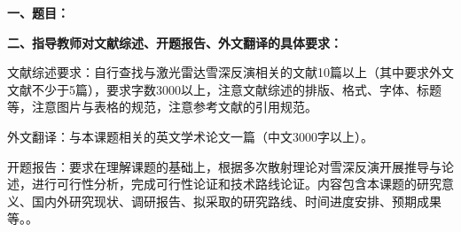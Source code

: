 \thispagestyle{tocprevious}
\pagestyle{tocprevious}

{
    \setlength{\parindent}{0em}
    \par {\bfseries 一、题目：\Title}
    \\
    \par {\bfseries 二、指导教师对文献综述、开题报告、外文翻译的具体要求：}
}
\vspace{0.5em}
\par 文献综述要求：自行查找与激光雷达雪深反演相关的文献10篇以上（其中要求外文文献不少于5篇），要求字数3000以上，注意文献综述的排版、格式、字体、标题等，注意图片与表格的规范，注意参考文献的引用规范。

\noindent 外文翻译：与本课题相关的英文学术论文一篇（中文3000字以上）。

\noindent 开题报告：要求在理解课题的基础上，根据多次散射理论对雪深反演开展推导与论述，进行可行性分析，完成可行性论证和技术路线论证。内容包含本课题的研究意义、国内外研究现状、调研报告、拟采取的研究路线、时间进度安排、预期成果等。。

\mbox{} \vfill

\signature{指导教师（签名）}
